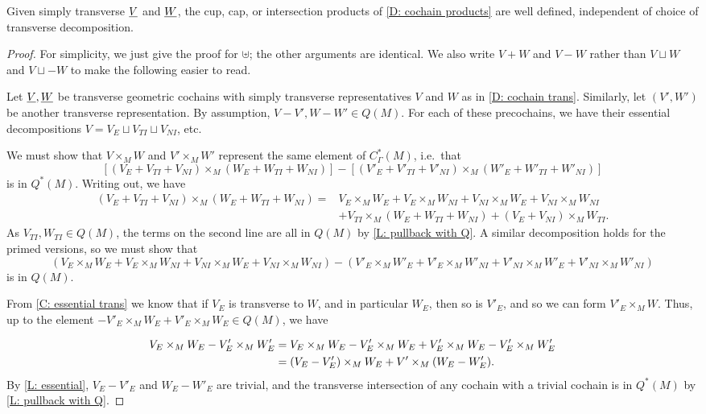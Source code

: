 \begin{theorem}\label{T: cochain product}
Given simply transverse $\underline{V}$ and $\underline{W}$, the cup, cap, or intersection products of \cref{D: cochain products} are well defined, independent of choice of transverse decomposition.
\end{theorem}
\begin{proof}
For simplicity, we just give the proof for $\uplus$; the other arguments are identical. We also write $V+W$ and $V-W$ rather than $V \sqcup W$ and $V\sqcup-W$ to make the following easier to read.

Let $\underline{V},\underline{W}$ be transverse geometric cochains with simply transverse representatives $V$ and $W$ as in \cref{D: cochain trans}. Similarly, let $(V',W')$ be another transverse representation.
By assumption, $V-V', W-W' \in Q(M)$. For each of these precochains, we have their essential decompositions $V = V_E \sqcup V_{TI} \sqcup V_{NI}$, etc.

We must show that $V \times_M W$ and $V' \times_M W'$ represent the same element of $C^*_\Gamma(M)$, i.e.\ that
$$[(V_E+V_{TI}+V_{NI}) \times_M (W_E+W_{TI}+W_{NI})] - [(V'_E+V'_{TI}+V'_{NI}) \times_M (W'_E+W'_{TI}+W'_{NI})]$$
is in $Q^*(M)$. Writing out, we have
\begin{align*}(V_E+V_{TI}+V_{NI}) \times_M (W_E+W_{TI}+W_{NI}) = &V_E \times_M W_E+V_E \times_M W_{NI}+V_{NI} \times_M W_E+V_{NI} \times_M W_{NI}\\
&+V_{TI} \times_M (W_E+W_{TI}+W_{NI})+(V_E+V_{NI}) \times_M W_{TI}.
\end{align*}
As $V_{TI},W_{TI} \in Q(M)$, the terms on the second line are all in $Q(M)$ by \cref{L: pullback with Q}.
A similar decomposition holds for the primed versions, so we must show that
\begin{equation}\label{E: intersect}
(V_E \times_M W_E+V_E \times_M W_{NI}+V_{NI} \times_M W_E+V_{NI} \times_M W_{NI})-(V'_E \times_M W'_E+V'_E \times_M W'_{NI}+V'_{NI} \times_M W'_E+V'_{NI} \times_M W'_{NI})
\end{equation}
is in $Q(M)$.

From \cref{C: essential trans} we know that if $V_E$ is transverse to $W$, and in particular $W_E$, then so is $V'_E$, and so we can form $V'_E \times_M W$.
 Thus, up to the element $-V'_E \times_M W_E+V'_E \times_M W_E \in Q(M)$, we have

\begin{align}
V_E \times_M W_E -V'_E \times_M W'_E& = V_E \times_M W_E-V'_E \times_M W_E+V'_E \times_M W_E-V'_E \times_M W'_E\notag\\
& = (V_E-V'_E) \times_M W_E+V' \times_M (W_E-W'_E).\label{E: transfer}
\end{align}
By \cref{L: essential}, $V_E-V'_E$ and $W_E-W'_E$ are trivial, and the transverse intersection of any cochain with a trivial cochain is in $Q^*(M)$ by
\cref{L: pullback with Q}.


\end{proof}
